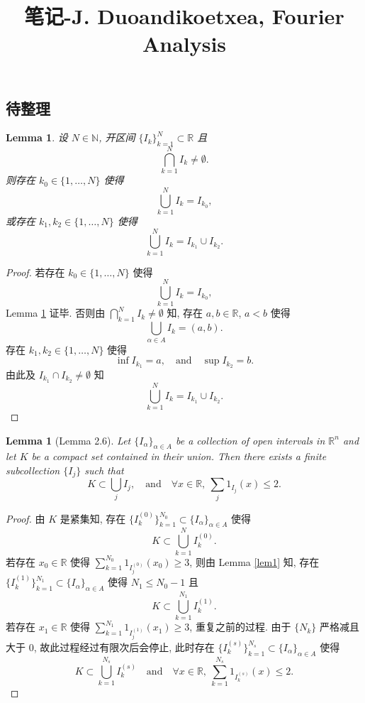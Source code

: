 \documentclass[a4paper,11pt]{article}
\title{笔记-J. Duoandikoetxea, Fourier Analysis}
\newtheorem{lemma}[theorem]{Lemma}
\theoremstyle{definition}
\begin{document}
\begin{CJK*}{UTF8}{gbsn}

\maketitle

\section{待整理}

\begin{lemma} \label{h2}
    设 $ N \in \mathbb{N} $, 开区间 $ \{I_k\}_{k = 1}^N \subset \mathbb{R} $ 且
    $$
        \bigcap_{k = 1}^N I_k \neq \emptyset.
    $$
    则存在 $ k_0 \in \{1, \ldots, N\} $ 使得
    $$
        \bigcup_{k = 1}^N I_k = I_{k_0},
    $$
    或存在 $ k_1, k_2 \in \{1, \ldots, N\} $ 使得
    $$
        \bigcup_{k = 1}^N I_k = I_{k_1} \cup I_{k_2}.
    $$
\end{lemma}

\begin{proof}
    若存在 $ k_0 \in \{1, \ldots, N\} $ 使得
    $$
        \bigcup_{k = 1}^N I_k = I_{k_0},
    $$
    Lemma \ref{h2} 证毕. 
    否则由 $ \bigcap_{k = 1}^N I_k \neq \emptyset $ 知, 
    存在 $ a, b \in \mathbb{R} $, $ a < b $ 使得
    $$
        \bigcup_{\alpha \in A} I_k = (a, b).
    $$
    存在 $ k_1, k_2 \in \{1, \ldots, N\} $ 使得
    $$
        \inf I_{k_1} = a, \quad \text{and} \quad \sup I_{k_2} = b.
    $$
    由此及 $ I_{k_1} \cap I_{k_2} \neq \emptyset $ 知
    $$
        \bigcup_{k = 1}^N I_k = I_{k_1} \cup I_{k_2}.
    $$
\end{proof}

\begin{lemma}[Lemma 2.6]
    Let $ \{ I_\alpha \}_{\alpha \in A} $ be a collection of open intervals in $ \mathbb{R}^n $ 
    and let $ K $ be a compact set contained in their union. Then there exists a finite subcollection
    $ \{ I_j \} $ such that
    $$
        K \subset \bigcup_j I_j, \quad \text{and} \quad 
        \forall x \in \mathbb{R},\ \sum_j \mathrm{1}_{I_j} (x) \leq 2.
    $$
\end{lemma}

\begin{proof}
    由 $ K $ 是紧集知, 存在 $ \{I_k^{(0)}\}_{k = 1}^{N_0} \subset \{ I_\alpha \}_{\alpha \in A} $ 使得
    $$
        K \subset \bigcup_{k = 1}^N I_k^{(0)}.
    $$
    若存在 $ x_0 \in \mathbb{R} $ 使得 $ \sum_{k = 1}^{N_0} \mathrm{1}_{I_j^{(0)}} (x_0) \geq 3 $, 
    则由 Lemma \ref{lem1} 知,
    存在 $ \{I_k^{(1)}\}_{k = 1}^{N_1} \subset \{ I_\alpha \}_{\alpha \in A} $ 使得 $ N_1 \leq N_0 - 1 $ 且
    $$
        K \subset \bigcup_{k = 1}^{N_1} I_k^{(1)}.
    $$
    若存在 $ x_1 \in \mathbb{R} $ 使得 $ \sum_{k = 1}^{N_1} \mathrm{1}_{I_j^{(1)}} (x_1) \geq 3 $, 重复之前的过程.
    由于 $ \{N_k\} $ 严格减且大于 $ 0 $,
    故此过程经过有限次后会停止, 此时存在 $ \{I_k^{(s)}\}_{k = 1}^{N_s} \subset \{ I_\alpha \}_{\alpha \in A} $ 使得
    $$
        K \subset \bigcup_{k = 1}^{N_s} I_k^{(s)} \quad \text{and} \quad 
        \forall x \in \mathbb{R},\ \sum_{k = 1}^{N_s} \mathrm{1}_{I_k^{(s)}} (x) \leq 2.
    $$
\end{proof}


\end{CJK*}
\end{document}
